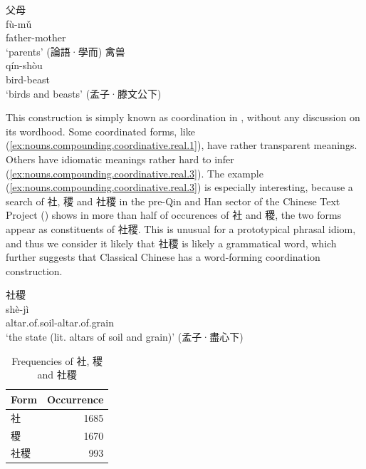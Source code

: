 \documentclass[UTF8, a4paper, oneside, scheme=plain, 12pt]{ctexrep}
\newcommand*{\citepage}[1]{p.~{#1}}
\newcommand{\translate}[1]{`#1'}
\begin{document}
\begin{exe}
    \ex\label{ex:nouns.compounding.coordinative.real.1}
    \glll 父母 \\
    fù-mǔ \\
    father-mother \\
    \glt\translate{parents} \hfill (論語·學而)
    \ex\label{ex:nouns.compounding.coordinative.real.2}
    \glll 禽兽 \\
    qín-shòu \\
    bird-beast \\
    \glt\translate{birds and beasts} \hfill (孟子·滕文公下)
\end{exe}

This construction is simply known as coordination in \citet[\citepage{61}]{pulleyblank1995outline}, without any discussion on its wordhood.
Some coordinated forms, like (\ref{ex:nouns.compounding.coordinative.real.1}), have rather transparent meanings.
Others have idiomatic meanings rather hard to infer (\ref{ex:nouns.compounding.coordinative.real.3}).
The example (\ref{ex:nouns.compounding.coordinative.real.3}) is especially interesting,
because a search of 社, 稷 and 社稷 in the pre-Qin and Han sector of the Chinese Text Project ()
shows in more than half of occurences of 社 and 稷, the two forms appear as constituents of 社稷.
This is unusual for a prototypical phrasal idiom,
and thus we consider it likely that 社稷 is likely a grammatical word,
which further suggests that Classical Chinese has a word-forming coordination construction.

\begin{exe}
    \ex\label{ex:nouns.compounding.coordinative.real.3}
    \glll 社稷 \\
    shè-jì \\
    altar.of.soil-altar.of.grain \\
    \glt\translate{the state (lit. altars of soil and grain)} \hfill (孟子·盡心下)
\end{exe}

\begin{table}[H]
    \caption{Frequencies of 社, 稷 and 社稷}
    \label{tbl:sheji-frequency}
    \centering
    \begin{tabular}{lr}
        \toprule
        Form & Occurrence \\
        \midrule
        社 & 1685 \\
        稷 & 1670 \\
        社稷 & 993 \\
        \bottomrule
    \end{tabular}
\end{table}
\end{document}
